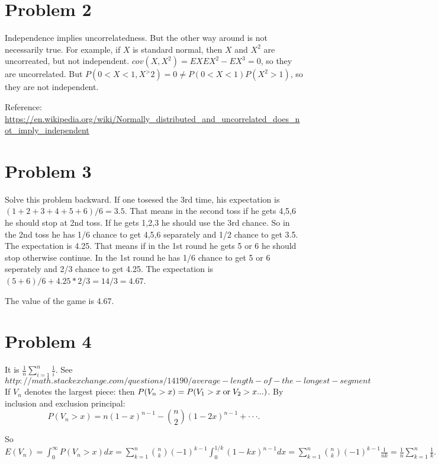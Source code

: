 \documentclass[12pt]{amsart}
\begin{document}
\section{Problem 2}
Independence implies uncorrelatedness. But the other way around is not necessarily true. For example, if $X$ is standard normal, then $X$ and $X^2$ are uncorreated, but not independent. $cov(X,X^2)=EXEX^2-EX^3=0$, so they are uncorrelated. But $P(0<X<1,X^>2)=0\neq P(0<X<1)P(X^2>1)$, so they are not independent. 

Reference: \url{https://en.wikipedia.org/wiki/Normally_distributed_and_uncorrelated_does_not_imply_independent}


\section{Problem 3}

Solve this problem backward. If one tosesed the 3rd time, his expectation is $(1+2+3+4+5+6)/6=3.5$. 
That means in the second toss if he gets 4,5,6 he should stop at 2nd toss. If he gets 1,2,3 he should use the 3rd chance.
So in the 2nd toss he has 1/6 chance to get 4,5,6 separately and 1/2 chance to get 3.5. The expectation is 4.25.
That means if in the 1st round he gets 5 or 6 he should stop otherwise continue.
In the 1st round he has 1/6 chance to get 5 or 6 seperately and 2/3 chance to get 4.25.
The expectation is $(5+6)/6+ 4.25*2/3 = 14/3=4.67$.

The value of the game is 4.67.

\section{Problem 4}
It is $\frac{1}{n}\sum_{i=1}^n\frac{1}{i}$. See 
$$http://math.stackexchange.com/questions/14190/average-length-of-the-longest-segment$$
If $V_n$ denotes the largest piece: then $P(V_n>x)=P(V_1>x\; {\rm or}\; V_2>x...)$. By inclusion and exclusion principal: 
$$P(V_n>x)=n(1-x)^{n-1}-{n \choose 2}(1-2x)^{n-1}+\cdot\cdot\cdot.$$

So $E(V_n)=\int_0^\infty P(V_n>x)dx=\sum_{k=1}^n{n \choose k}(-1)^{k-1}\int_0^{1/k}(1-kx)^{n-1}dx=\sum_{k=1}^n{n \choose k}(-1)^{k-1}\frac{1}{nk}=\frac{1}{n}\sum_{k=1}^n\frac{1}{k}.$
\end{document}

